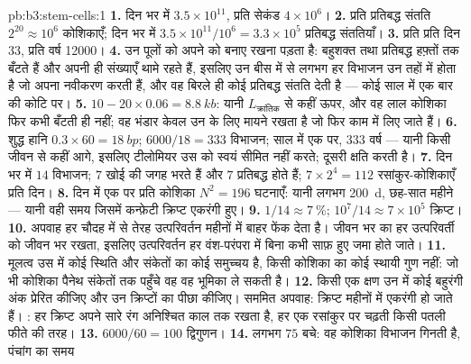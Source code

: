 \begin{solution}{pb:b3:stem-cells:1}
\textbf{1.} दिन भर में $3.5\times 10^{11}$, प्रति सेकंड $4\times 10^{6}$।
\textbf{2.} प्रति प्रतिबद्ध संतति $2^{20} \approx 10^{6}$ कोशिकाएँ;
दिन भर में $3.5\times 10^{11}/10^{6} = 3.3\times 10^{5}$ प्रतिबद्ध संततियाँ।
\textbf{3.} प्रति  प्रति दिन $33$, प्रति वर्ष \num{12000}।
\textbf{4.} उन  पूलों को अपने को बनाए रखना पड़ता है: बहुशक्त
तथा प्रतिबद्ध  हफ़्तों तक बँटते हैं और अपनी ही संख्याएँ थामे
रहते हैं, इसलिए उन बीस में से लगभग हर विभाजन उन तहों में होता है जो
अपना नवीकरण करती हैं, और वह  बिरले ही कोई प्रतिबद्ध संतति
देती है --- कोई साल में एक बार की कोटि पर।
\textbf{5.} $10 - 20\times 0.06 = \qty{8.8}{kb}$: यानी
$L_{\text{क्रांतिक}}$ से कहीं ऊपर, और वह लाल कोशिका फिर कभी बँटती ही नहीं;
वह भंडार केवल उन  के लिए मायने रखता है जो फिर काम में लिए
जाते हैं।
\textbf{6.} शुद्ध हानि $0.3\times 60 = \qty{18}{bp}$; $6000/18 = 333$
विभाजन; साल में एक पर, $333$ वर्ष --- यानी किसी जीवन से कहीं आगे,
इसलिए टीलोमियर उस  को स्वयं सीमित नहीं करते; दूसरी क्षति
करती है।
\textbf{7.} दिन भर में $14$ विभाजन; $7$ खोई  की जगह भरते हैं
और $7$ प्रतिबद्ध होते हैं; $7\times 2^{4} = 112$ रसांकुर-कोशिकाएँ प्रति
दिन।
\textbf{8.} दिन में एक पर प्रति कोशिका $N^{2} = 196$ घटनाएँ: यानी लगभग
\qty{200}{d}, छह-सात महीने --- यानी वही समय जिसमें कन्फ़ेटी क्रिप्ट
एकरंगी हुए।
\textbf{9.} $1/14 \approx \qty{7}{\%}$; $10^{7}/14 \approx 7\times 10^{5}$
क्रिप्ट।
\textbf{10.} अपवाह हर चौदह में से तेरह उत्परिवर्तन महीनों में बाहर फेंक
देता है। जीवन भर का  हर उत्परिवर्ती  को जीवन भर
रखता, इसलिए उत्परिवर्तन हर वंश-परंपरा में बिना कभी साफ़ हुए जमा होते
जाते।
\textbf{11.} मूलत्व उस  में कोई स्थिति और संकेतों का कोई समुच्चय
है, किसी कोशिका का कोई स्थायी गुण नहीं: जो भी कोशिका पैनेथ संकेतों तक
पहुँचे वह वह भूमिका ले सकती है।
\textbf{12.} किसी एक क्षण उन  में कोई बहुरंगी अंक प्रेरित
कीजिए और उन क्रिप्टों का पीछा कीजिए। सममित अपवाह: क्रिप्ट महीनों में
एकरंगी हो जाते हैं। : हर क्रिप्ट अपने सारे रंग अनिश्चित काल
तक रखता है, हर एक रसांकुर पर चढ़ती किसी पतली फीते की तरह।
\textbf{13.} $6000/60 = 100$ द्विगुणन।
\textbf{14.} लगभग $75$ बचे: वह कोशिका विभाजन गिनती है, पंचांग का समय

\end{solution}
